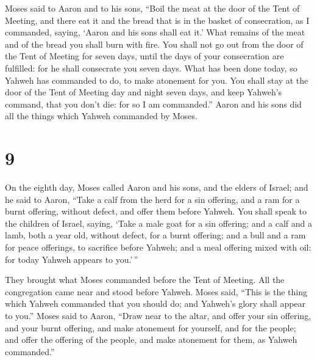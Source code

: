 Moses said to Aaron and to his sons, ``Boil the meat at
the door of the Tent of Meeting, and there eat it and the bread that is
in the basket of consecration, as I commanded, saying, `Aaron and his
sons shall eat it.'  What remains of the meat and of the
bread you shall burn with fire.  You shall not go out
from the door of the Tent of Meeting for seven days, until the days of
your consecration are fulfilled: for he shall consecrate you seven days.
 What has been done today, so Yahweh has commanded to do,
to make atonement for you.  You shall stay at the door of
the Tent of Meeting day and night seven days, and keep Yahweh's command,
that you don't die: for so I am commanded.''  Aaron and
his sons did all the things which Yahweh commanded by Moses.

\hypertarget{section-8}{%
\section{9}\label{section-8}}

 On the eighth day, Moses called Aaron and his sons, and
the elders of Israel;  and he said to Aaron, ``Take a calf
from the herd for a sin offering, and a ram for a burnt offering,
without defect, and offer them before Yahweh.  You shall
speak to the children of Israel, saying, `Take a male goat for a sin
offering; and a calf and a lamb, both a year old, without defect, for a
burnt offering;  and a bull and a ram for peace offerings,
to sacrifice before Yahweh; and a meal offering mixed with oil: for
today Yahweh appears to you.'\,''

 They brought what Moses commanded before the Tent of
Meeting. All the congregation came near and stood before Yahweh.
 Moses said, ``This is the thing which Yahweh commanded
that you should do; and Yahweh's glory shall appear to you.''
 Moses said to Aaron, ``Draw near to the altar, and offer
your sin offering, and your burnt offering, and make atonement for
yourself, and for the people; and offer the offering of the people, and
make atonement for them, as Yahweh commanded.''

